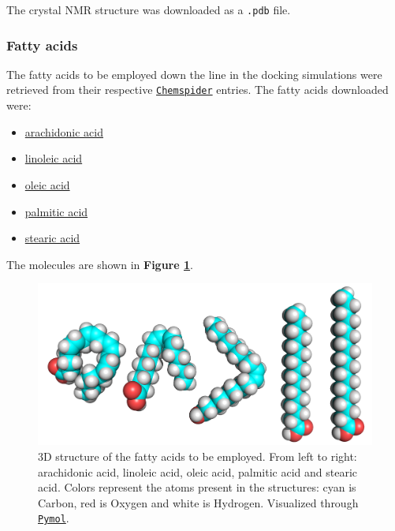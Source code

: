 The crystal NMR structure was downloaded as a \texttt{.pdb} file.

\subsubsection{Fatty acids}

The fatty acids to be employed down the line in the docking simulations were retrieved from their respective \href{https://www.chemspider.com/}{\texttt{Chemspider}} entries. The fatty acids downloaded were:

\begin{itemize}
    \item\href{https://www.chemspider.com/Chemical-Structure.392692.html}{arachidonic acid}
    \item\href{https://www.chemspider.com/Chemical-Structure.4444105.html}{linoleic acid}
    \item\href{https://www.chemspider.com/Chemical-Structure.393217.html}{oleic acid}
    \item\href{https://www.chemspider.com/Chemical-Structure.960.html}{palmitic acid}
    \item\href{https://www.chemspider.com/Chemical-Structure.5091.html}{stearic acid}
\end{itemize}

The molecules are shown in \textbf{Figure \ref{fig:fatty_acids}}.

\begin{figure}[htbp!]
    \centering
    \includegraphics[width=0.75\linewidth]{assets/fatty_acids.png}
    \caption[3D structure of the fatty acids to be employed.]{3D structure of the fatty acids to be employed. From left to right: arachidonic acid, linoleic acid, oleic acid, palmitic acid and stearic acid. Colors represent the atoms present in the structures: cyan is Carbon, red is Oxygen and white is Hydrogen. Visualized through \href{https://pymol.org/2/}{\texttt{Pymol}}.}
    \label{fig:fatty_acids}
\end{figure}

